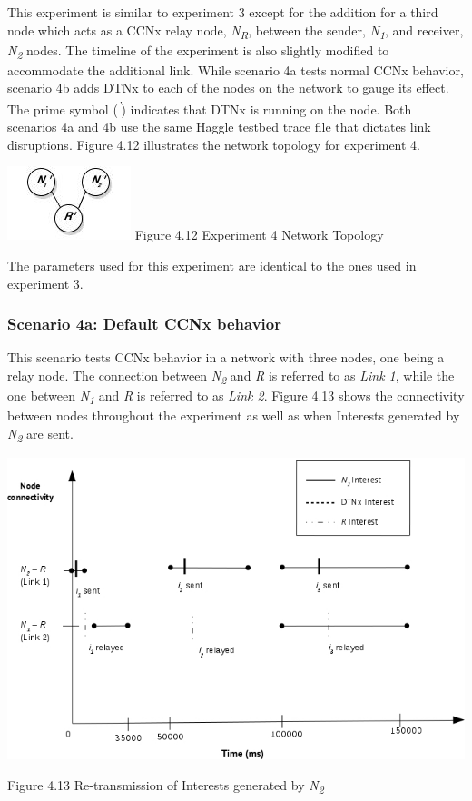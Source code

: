 \documentclass[a4paper,12pt]{report}      %
\begin{document}
This experiment is similar to experiment 3 except for the addition for a third node which acts as a CCNx relay node, \emph{N\textsubscript{R}}, between the sender, \emph{N\textsubscript{1}}, and receiver, \emph{N\textsubscript{2}} nodes. The timeline of the experiment is also slightly modified to accommodate the additional link. While scenario 4a tests normal CCNx behavior, scenario 4b adds DTNx to each of the nodes on the network to gauge its effect. The prime symbol (\emph{\textsuperscript{'}}) indicates that DTNx is running on the node. Both scenarios 4a and 4b use the same Haggle testbed trace file that dictates link disruptions. Figure 4.12 illustrates the network topology for experiment 4.

\begin{center}
\includegraphics[scale=0.75]{exp4topo.jpg}\newline
Figure 4.12 Experiment 4 Network Topology 
\end{center}

\noindent The parameters used for this experiment are identical to the ones used in experiment 3.

\subsubsection{Scenario 4a: Default CCNx behavior}

This scenario tests CCNx behavior in a network with three nodes, one being a relay node. The connection between \emph{N\textsubscript{2}} and \emph{R} is referred to as \emph{Link 1}, while the one between \emph{N\textsubscript{1}} and \emph{R} is referred to as \emph{Link 2}. Figure 4.13 shows the connectivity between nodes throughout the experiment as well as when Interests generated by \emph{N\textsubscript{2}} are sent.

\noindent\includegraphics[scale=0.55]{exp4a_timediag.jpg}\newline
\begin{center}Figure 4.13 Re-transmission of Interests generated by \emph{N\textsubscript{2}}\end{center} 
\end{document}
